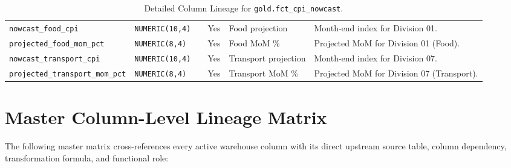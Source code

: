 \documentclass[a4paper, 11pt]{article}
\begin{document}
\begin{table}[H]
\begin{tabularx}{\textwidth}{@{}l p{2.4cm} c c >{\raggedright\arraybackslash}p{4.0cm} >{\raggedright\arraybackslash}X@{}}
\texttt{nowcast\_food\_cpi} & \texttt{NUMERIC(10,4)} & & Yes & Food projection & Month-end index for Division 01. \\
\texttt{projected\_food\_mom\_pct} & \texttt{NUMERIC(8,4)} & & Yes & Food MoM \% & Projected MoM for Division 01 (Food). \\
\texttt{nowcast\_transport\_cpi} & \texttt{NUMERIC(10,4)} & & Yes & Transport projection & Month-end index for Division 07. \\
\texttt{projected\_transport\_mom\_pct} & \texttt{NUMERIC(8,4)} & & Yes & Transport MoM \% & Projected MoM for Division 07 (Transport). \\
\bottomrule
\end{tabularx}
\caption{Detailed Column Lineage for \texttt{gold.fct\_cpi\_nowcast}.}
\end{table}

\newpage
\section{Master Column-Level Lineage Matrix}

The following master matrix cross-references every active warehouse column with its direct upstream source table, column dependency, transformation formula, and functional role:
\end{document}
